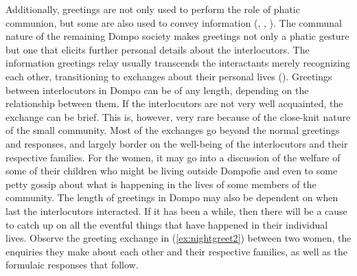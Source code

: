\documentclass[output=paper,colorlinks,citecolor=brown]{langscibook}
\begin{document}
Additionally, greetings are not only used to perform the role of phatic communion, but some are also used to convey information (\cite[64]{Duranti1997}, \cite[151]{Malinowski1972}, \cite[37]{Nwoye1993}). The communal nature of the remaining Dompo society makes greetings not only a phatic gesture but one that elicits further personal details about the interlocutors. The information greetings relay usually transcends the interactants merely recognizing each other, transitioning to exchanges about their personal lives (\cite{Couplandetal1992}). Greetings between interlocutors in Dompo can be of any length, depending on the relationship between them. If the interlocutors are not very well acquainted, the exchange can be brief. This is, however, very rare because of the close-knit nature of the small community. Most of the exchanges go beyond the normal greetings and responses, and largely border on the well-being of the interlocutors and their respective families. For the women, it may go into a discussion of the welfare of some of their children who might be living outside Dompofie and even to some petty gossip about what is happening in the lives of some members of the community. The length of greetings in Dompo may also be dependent on when last the interlocutors interacted. If it has been a while, then there will be a cause to catch up on all the eventful things that have happened in their individual lives. Observe the greeting exchange in (\ref{ex:nightgreet2}) between two women, the enquiries they make about each other and their respective families, as well as the formulaic responses that follow. 
\end{document}
